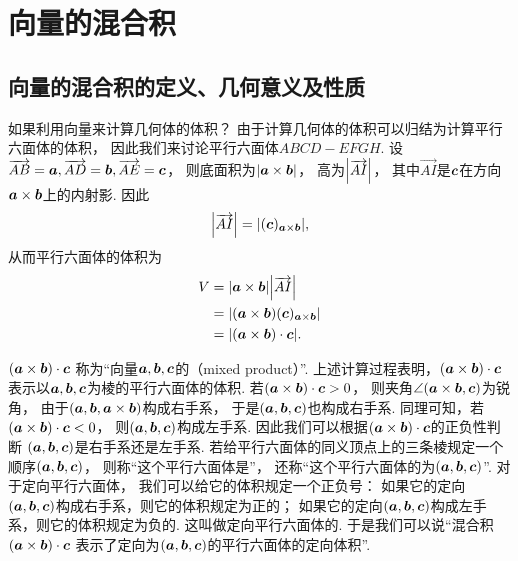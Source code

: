 \section{向量的混合积}
\subsection{向量的混合积的定义、几何意义及性质}
如果利用向量来计算几何体的体积？
由于计算几何体的体积可以归结为计算平行六面体的体积，
因此我们来讨论平行六面体\(ABCD-EFGH\).
设\(\overrightarrow{AB}=\boldsymbol{a},
\overrightarrow{AD}=\boldsymbol{b},
\overrightarrow{AE}=\boldsymbol{c}\)，
则底面积为\(\abs{\boldsymbol{a}\times\boldsymbol{b}}\)，
高为\(\abs{\overrightarrow{AI}}\)，
其中\(\vec{AI}\)是\(\boldsymbol{c}\)在方向\(\boldsymbol{a}\times\boldsymbol{b}\)上的内射影.
因此\begin{equation*}
	\abs{\overrightarrow{AI}}
	= \abs{(\boldsymbol{c})_{\boldsymbol{a}\times\boldsymbol{b}}},
\end{equation*}
从而平行六面体的体积为
\begin{align*}
	V &= \abs{\boldsymbol{a}\times\boldsymbol{b}} \abs{\overrightarrow{AI}} \\
	&= \abs{(\boldsymbol{a}\times\boldsymbol{b}) (\boldsymbol{c})_{\boldsymbol{a}\times\boldsymbol{b}}} \\
	&= \abs{
			(\boldsymbol{a}\times\boldsymbol{b})\cdot\boldsymbol{c}
		}.
\end{align*}

\((\boldsymbol{a}\times\boldsymbol{b})\cdot\boldsymbol{c}\)
称为“向量\(\boldsymbol{a},\boldsymbol{b},\boldsymbol{c}\)的（mixed product）”.
上述计算过程表明，\((\boldsymbol{a}\times\boldsymbol{b})\cdot\boldsymbol{c}\)
表示以\(\boldsymbol{a},\boldsymbol{b},\boldsymbol{c}\)为棱的平行六面体的体积.
若\((\boldsymbol{a}\times\boldsymbol{b})\cdot\boldsymbol{c}>0\)，
则夹角\(\angle(\boldsymbol{a}\times\boldsymbol{b},\boldsymbol{c})\)为锐角，
由于\((\boldsymbol{a},\boldsymbol{b},\boldsymbol{a}\times\boldsymbol{b})\)构成右手系，
于是\((\boldsymbol{a},\boldsymbol{b},\boldsymbol{c})\)也构成右手系.
同理可知，若\((\boldsymbol{a}\times\boldsymbol{b})\cdot\boldsymbol{c}<0\)，
则\((\boldsymbol{a},\boldsymbol{b},\boldsymbol{c})\)构成左手系.
因此我们可以根据\((\boldsymbol{a}\times\boldsymbol{b})\cdot\boldsymbol{c}\)的正负性判断
\((\boldsymbol{a},\boldsymbol{b},\boldsymbol{c})\)是右手系还是左手系.
若给平行六面体的同义顶点上的三条棱规定一个顺序\((\boldsymbol{a},\boldsymbol{b},\boldsymbol{c})\)，
则称“这个平行六面体是”，
还称“这个平行六面体的为\((\boldsymbol{a},\boldsymbol{b},\boldsymbol{c})\)”.
对于定向平行六面体，
我们可以给它的体积规定一个正负号：
如果它的定向\((\boldsymbol{a},\boldsymbol{b},\boldsymbol{c})\)构成右手系，则它的体积规定为正的；
如果它的定向\((\boldsymbol{a},\boldsymbol{b},\boldsymbol{c})\)构成左手系，则它的体积规定为负的.
这叫做定向平行六面体的.
于是我们可以说“混合积\((\boldsymbol{a}\times\boldsymbol{b})\cdot\boldsymbol{c}\)
表示了定向为\((\boldsymbol{a},\boldsymbol{b},\boldsymbol{c})\)的平行六面体的定向体积”.

